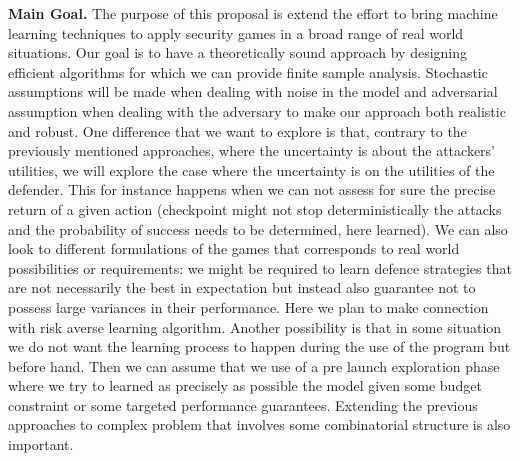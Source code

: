 \documentclass[a4paper,11pt]{article}
\renewcommand{\cite}{\autocite} %
\begin{document}
\textbf{Main Goal.} The purpose of this proposal is extend the effort to bring machine learning techniques 
to apply security games in a broad range of real world situations.
Our goal is to have a theoretically sound approach by designing efficient algorithms for which we can provide finite sample analysis.
Stochastic assumptions will be made when dealing with noise in the model and adversarial assumption when dealing with the adversary to make our approach both realistic and robust.
One difference that we want to explore is that, contrary to the previously mentioned approaches, where the uncertainty is  about the attackers' utilities, we will explore the case where the uncertainty is on the utilities of the defender. This for instance happens when we can not assess for sure the precise return of a given action (checkpoint might not stop deterministically the attacks and the probability of success needs to be determined, here learned).
We can also look to different formulations of the games that corresponds to real world possibilities or requirements: we might be required to learn defence strategies that are not necessarily the best in expectation but instead also guarantee not to possess large variances in their performance. Here we plan to make connection with risk averse learning algorithm. Another possibility is that in some situation we do not want the learning process to happen during the use of the program but before hand. Then we can assume that we use of a pre launch exploration phase where we try to learned as precisely as possible the model given some budget constraint or some targeted performance guarantees. Extending the previous approaches to complex problem that involves some combinatorial structure is also important.

\end{document}
